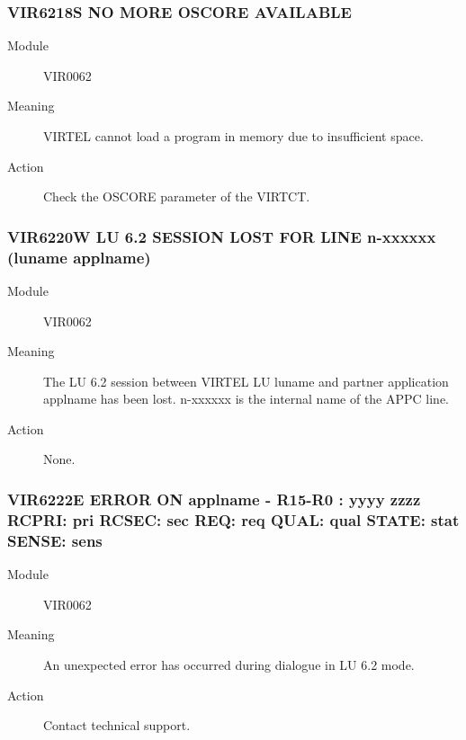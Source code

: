 \documentclass[letterpaper,10pt,english]{sphinxmanual}
\begin{document}
\subsubsection{VIR6218S NO MORE OSCORE AVAILABLE}
\label{\detokenize{messages:vir6218s-no-more-oscore-available}}\begin{description}
\item[{Module}] \leavevmode
VIR0062

\item[{Meaning}] \leavevmode
VIRTEL cannot load a program in memory due to insufficient space.

\item[{Action}] \leavevmode
Check the OSCORE parameter of the VIRTCT.

\end{description}


\subsubsection{VIR6220W LU 6.2 SESSION LOST FOR LINE n-xxxxxx (luname \textendash{} applname)}
\label{\detokenize{messages:vir6220w-lu-6-2-session-lost-for-line-n-xxxxxx-luname-applname}}\begin{description}
\item[{Module}] \leavevmode
VIR0062

\item[{Meaning}] \leavevmode
The LU 6.2 session between VIRTEL LU luname and partner application applname has been lost. n-xxxxxx is the internal name of the APPC line.

\item[{Action}] \leavevmode
None.

\end{description}


\subsubsection{VIR6222E ERROR ON applname - R15-R0 : yyyy zzzz RCPRI: pri RCSEC: sec REQ: req QUAL: qual STATE: stat SENSE: sens}
\label{\detokenize{messages:vir6222e-error-on-applname-r15-r0-yyyy-zzzz-rcpri-pri-rcsec-sec-req-req-qual-qual-state-stat-sense-sens}}\begin{description}
\item[{Module}] \leavevmode
VIR0062

\item[{Meaning}] \leavevmode
An unexpected error has occurred during dialogue in LU 6.2 mode.

\item[{Action}] \leavevmode
Contact technical support.

\end{description}
\end{document}
